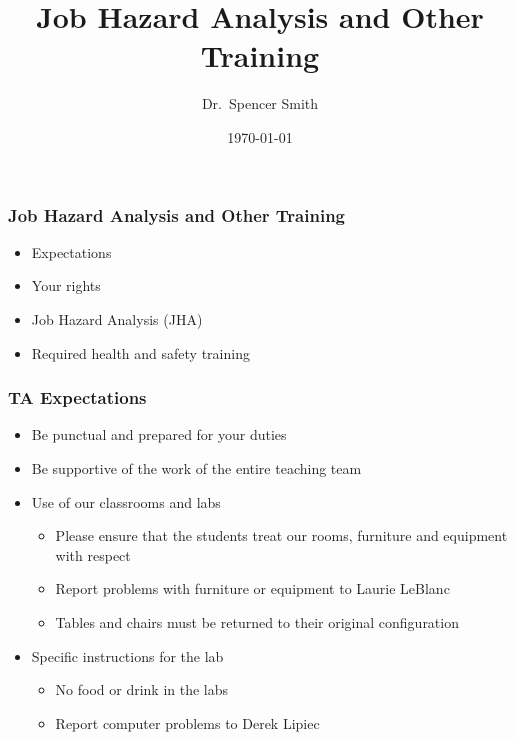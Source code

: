 \documentclass[handout]{beamer} %
\title[Job Hazard Analysis (slide \thepage)]{Job Hazard Analysis and Other Training}
\author[Smith]{Dr.~Spencer Smith}
\institute{Faculty of Engineering, McMaster University}
\date{\today}
\begin{document}

\maketitle



\begin{frame}
\frametitle{Job Hazard Analysis and Other Training}

\begin{itemize}

\item Expectations
\item Your rights
\item Job Hazard Analysis (JHA)
\item Required health and safety training

\end{itemize}

\end{frame}


\begin{frame}
\frametitle{TA Expectations}

\begin{itemize}

\item Be punctual and prepared for your duties
\item Be supportive of the work of the entire teaching team
\item Use of our classrooms and labs
\begin{itemize}
\item Please ensure that the students treat our rooms, furniture and equipment with respect
\item Report problems with furniture or equipment to Laurie LeBlanc
\item Tables and chairs must be returned to their original configuration
\end{itemize}
\item Specific instructions for the lab
\begin{itemize}
\item No food or drink in the labs
\item Report computer problems to Derek Lipiec
\end{itemize}

\end{itemize}

\end{frame}
\end{document}
